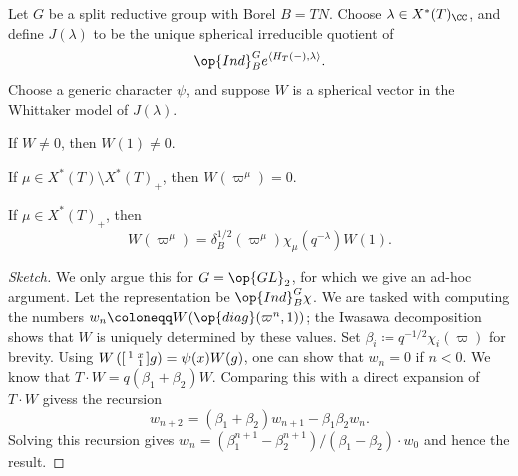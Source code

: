 \documentclass{article}
\begin{document}
\begin{theorem}
	Let $G$ be a split reductive group with Borel $B=TN$. Choose $\lambda\in X^*(T)_\CC$, and define $J(\lambda)$ to be the unique spherical irreducible quotient of
	\[\op{Ind}_B^Ge^{\langle H_T(-),\lambda\rangle}.\]
	Choose a generic character $\psi$, and suppose $W$ is a spherical vector in the Whittaker model of $J(\lambda)$.
	\begin{listalph}
		\item If $W\ne0$, then $W(1)\ne0$.
		\item If $\mu\in X^*(T)\setminus X^*(T)_+$, then $W(\varpi^\mu)=0$.
		\item If $\mu\in X^*(T)_+$, then
		\[W(\varpi^\mu)=\delta_B^{1/2}(\varpi^\mu)\chi_\mu\left(q^{-\lambda}\right)W(1).\]
	\end{listalph}
\end{theorem}
\begin{proof}[Sketch]
	We only argue this for $G=\op{GL}_2$, for which we give an ad-hoc argument. Let the representation be $\op{Ind}_B^G\chi$. We are tasked with computing the numbers $w_n\coloneqq W(\op{diag}(\varpi^n,1))$; the Iwasawa decomposition shows that $W$ is uniquely determined by these values. Set $\beta_i\coloneqq q^{-1/2}\chi_i(\varpi)$ for brevity. Using $W\left(\begin{bsmallmatrix}
		1 & x \\ & 1
	\end{bsmallmatrix}g\right)=\psi(x)W(g)$, one can show that $w_n=0$ if $n<0$. We know that $T\cdot W=q(\beta_1+\beta_2)W$. Comparing this with a direct expansion of $T\cdot W$ givess the recursion
	\[w_{n+2}=(\beta_1+\beta_2)w_{n+1}-\beta_1\beta_2w_n.\]
	Solving this recursion gives $w_n=\left(\beta_1^{n+1}-\beta_2^{n+1}\right)/(\beta_1-\beta_2)\cdot w_0$ and hence the result.
\end{proof}
\end{document}
